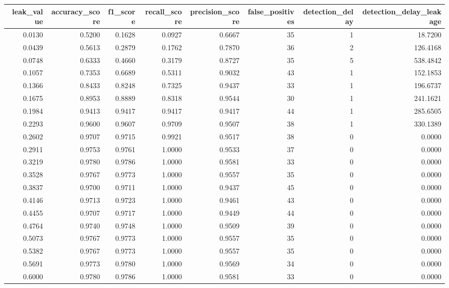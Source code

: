 \begin{tabular}{rrrrrrrr}
\toprule
leak\_value & accuracy\_score & f1\_score & recall\_score & precision\_score & false\_positives & detection\_delay & detection\_delay\_leakage \\
\midrule
0.0130 & 0.5200 & 0.1628 & 0.0927 & 0.6667 & 35 & 1 & 18.7200 \\
0.0439 & 0.5613 & 0.2879 & 0.1762 & 0.7870 & 36 & 2 & 126.4168 \\
0.0748 & 0.6333 & 0.4660 & 0.3179 & 0.8727 & 35 & 5 & 538.4842 \\
0.1057 & 0.7353 & 0.6689 & 0.5311 & 0.9032 & 43 & 1 & 152.1853 \\
0.1366 & 0.8433 & 0.8248 & 0.7325 & 0.9437 & 33 & 1 & 196.6737 \\
0.1675 & 0.8953 & 0.8889 & 0.8318 & 0.9544 & 30 & 1 & 241.1621 \\
0.1984 & 0.9413 & 0.9417 & 0.9417 & 0.9417 & 44 & 1 & 285.6505 \\
0.2293 & 0.9600 & 0.9607 & 0.9709 & 0.9507 & 38 & 1 & 330.1389 \\
0.2602 & 0.9707 & 0.9715 & 0.9921 & 0.9517 & 38 & 0 & 0.0000 \\
0.2911 & 0.9753 & 0.9761 & 1.0000 & 0.9533 & 37 & 0 & 0.0000 \\
0.3219 & 0.9780 & 0.9786 & 1.0000 & 0.9581 & 33 & 0 & 0.0000 \\
0.3528 & 0.9767 & 0.9773 & 1.0000 & 0.9557 & 35 & 0 & 0.0000 \\
0.3837 & 0.9700 & 0.9711 & 1.0000 & 0.9437 & 45 & 0 & 0.0000 \\
0.4146 & 0.9713 & 0.9723 & 1.0000 & 0.9461 & 43 & 0 & 0.0000 \\
0.4455 & 0.9707 & 0.9717 & 1.0000 & 0.9449 & 44 & 0 & 0.0000 \\
0.4764 & 0.9740 & 0.9748 & 1.0000 & 0.9509 & 39 & 0 & 0.0000 \\
0.5073 & 0.9767 & 0.9773 & 1.0000 & 0.9557 & 35 & 0 & 0.0000 \\
0.5382 & 0.9767 & 0.9773 & 1.0000 & 0.9557 & 35 & 0 & 0.0000 \\
0.5691 & 0.9773 & 0.9780 & 1.0000 & 0.9569 & 34 & 0 & 0.0000 \\
0.6000 & 0.9780 & 0.9786 & 1.0000 & 0.9581 & 33 & 0 & 0.0000 \\
\bottomrule
\end{tabular}

